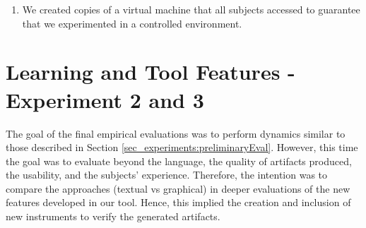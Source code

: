 \begin{enumerate} [label=\roman*.]
    On the other hand, the metrics used for the qualitative evaluation still served as a complementary input in the results obtained discussion, alongside the indication of possible points of improvement in our proposal;
    \item We created copies of a virtual machine that all subjects accessed to guarantee that we experimented in a controlled environment.
\end{enumerate}

\section{Learning and Tool Features - Experiment 2 and 3}
\label{sec_experiments:finalEval}

The goal of the final empirical evaluations was to perform dynamics similar to those described in Section \ref{sec_experiments:preliminaryEval}.
However, this time the goal was to evaluate beyond the language, the quality of artifacts produced, the usability, and the subjects' experience.
Therefore, the intention was to compare the approaches (textual vs graphical) in deeper evaluations of the new features developed in our tool.
Hence, this implied the creation and inclusion of new instruments to verify the generated artifacts.

